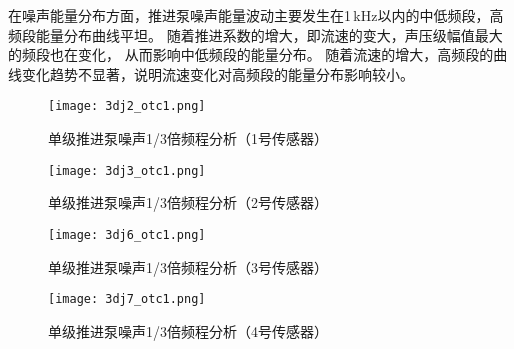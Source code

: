 在噪声能量分布方面，推进泵噪声能量波动主要发生在1\,kHz以内的中低频段，高频段能量分布曲线平坦。
随着推进系数的增大，即流速的变大，声压级幅值最大的频段也在变化，
从而影响中低频段的能量分布。
随着流速的增大，高频段的曲线变化趋势不显著，说明流速变化对高频段的能量分布影响较小。
\begin{figure}[htbp]
    \centering
    \texttt{[image: 3dj2\_otc1.png]}
    \caption{\label{fig:djotc1}单级推进泵噪声1/3倍频程分析（1号传感器）}
\end{figure}
\begin{figure}[htbp]
    \centering
    \texttt{[image: 3dj3\_otc1.png]}
    \caption{\label{fig:djotc2}单级推进泵噪声1/3倍频程分析（2号传感器）}
\end{figure}
\begin{figure}[htbp]
    \centering
    \texttt{[image: 3dj6\_otc1.png]}
    \caption{\label{fig:djotc3}单级推进泵噪声1/3倍频程分析（3号传感器）}
\end{figure}
\begin{figure}[htbp]
    \centering
    \texttt{[image: 3dj7\_otc1.png]}
    \caption{\label{fig:djotc4}单级推进泵噪声1/3倍频程分析（4号传感器）}
\end{figure}
\begin{comment}
\begin{figure}[htbp]
        \centering
        \subfigure[pic1.]{
        \texttt{[image: 3dj2\_otc.png]}
        }
\end{figure}
\addtocounter{figure}{-1}
\begin{figure}[htbp]
        \centering
        \addtocounter{figure}{1} 
        \subfigure[pic2.]{
        \texttt{[image: 3dj7\_otc.png]}
        }
\end{figure}
\addtocounter{figure}{-1}
\begin{figure}[htbp]
        \centering
        \addtocounter{figure}{1} 
        \vspace{0.02cm}
        \subfigure[pic2.]{
        \texttt{[image: 3dj6\_otc.png]}
        }
\end{figure}
\addtocounter{figure}{-1}
\begin{figure}[htbp]
        \centering
        \addtocounter{figure}{1} 
        \vspace{0.02cm}
        \subfigure[pic2.]{
        \texttt{[image: 3dj3\_otc.png]}
        }
        \caption{\label{fig:dj_modle}不同工况下单级推进泵水下噪声三分之一倍频程图}
\end{figure}
\end{comment}
